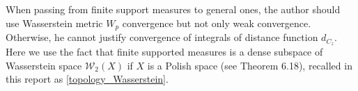 \begin{rmk}
	When passing from finite support measures to general ones, the author should use Wasserstein metric $W_p$ convergence but not only weak convergence. Otherwise, he cannot justify convergence of integrals of distance function $d_{C_z}$. Here we use the fact that finite supported measures is a dense subspace of Wasserstein space $\mathcal{W}_2(X)$ if $X$ is a Polish space (see \cite{villani2008optimal} Theorem 6.18), recalled in this report as \cref{topology_Wasserstein}.
\end{rmk}
